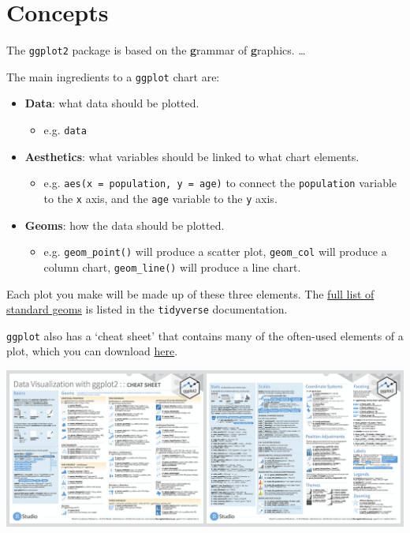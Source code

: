 \documentclass[]{book}
\providecommand{\tightlist}{%
  \setlength{\itemsep}{0pt}\setlength{\parskip}{0pt}}
\begin{document}
\hypertarget{concepts}{%
\section{Concepts}\label{concepts}}

The \texttt{ggplot2} package is based on the \textbf{g}rammar of \textbf{g}raphics. \ldots{}

The main ingredients to a \texttt{ggplot} chart are:

\begin{itemize}
\tightlist
\item
  \textbf{Data}: what data should be plotted.

  \begin{itemize}
  \tightlist
  \item
    e.g. \texttt{data}
  \end{itemize}
\item
  \textbf{Aesthetics}: what variables should be linked to what chart elements.

  \begin{itemize}
  \tightlist
  \item
    e.g. \texttt{aes(x\ =\ population,\ y\ =\ age)} to connect the \texttt{population} variable to the \texttt{x} axis, and the \texttt{age} variable to the \texttt{y} axis.
  \end{itemize}
\item
  \textbf{Geoms}: how the data should be plotted.

  \begin{itemize}
  \tightlist
  \item
    e.g. \texttt{geom\_point()} will produce a scatter plot, \texttt{geom\_col} will produce a column chart, \texttt{geom\_line()} will produce a line chart.
  \end{itemize}
\end{itemize}

Each plot you make will be made up of these three elements. The \href{https://ggplot2.tidyverse.org/reference/}{full list of standard geoms} is listed in the \texttt{tidyverse} documentation.

\texttt{ggplot} also has a `cheat sheet' that contains many of the often-used elements of a plot, which you can download \href{https://github.com/rstudio/cheatsheets/raw/master/data-visualization-2.1.pdf}{here}.

\begin{center}\includegraphics[width=17.08in]{atlas/ggplot_cheat_sheet} \end{center}
\end{document}
